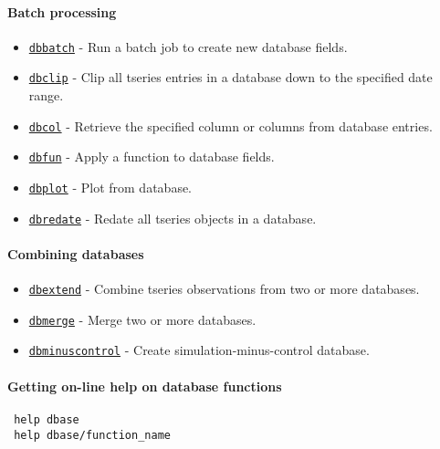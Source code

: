  \paragraph{Batch processing}
 
 \begin{itemize}
 \item
   \href{dbase/dbbatch}{\texttt{dbbatch}} - Run a batch job to create new
   database fields.
 \item
   \href{dbase/dbclip}{\texttt{dbclip}} - Clip all tseries entries in a
   database down to the specified date range.
 \item
   \href{dbase/dbcol}{\texttt{dbcol}} - Retrieve the specified column or
   columns from database entries.
 \item
   \href{dbase/dbfun}{\texttt{dbfun}} - Apply a function to database
   fields.
 \item
   \href{dbase/dbplot}{\texttt{dbplot}} - Plot from database.
 \item
   \href{dbase/dbredate}{\texttt{dbredate}} - Redate all tseries objects
   in a database.
 \end{itemize}
 
 \paragraph{Combining databases}
 
 \begin{itemize}
 \item
   \href{dbase/dbextend}{\texttt{dbextend}} - Combine tseries
   observations from two or more databases.
 \item
   \href{dbase/dbmerge}{\texttt{dbmerge}} - Merge two or more databases.
 \item
   \href{dbase/dbminuscontrol}{\texttt{dbminuscontrol}} - Create
   simulation-minus-control database.
 \end{itemize}
 
 \paragraph{Getting on-line help on database functions}
 
 \begin{verbatim}
 help dbase
 help dbase/function_name
 \end{verbatim}



